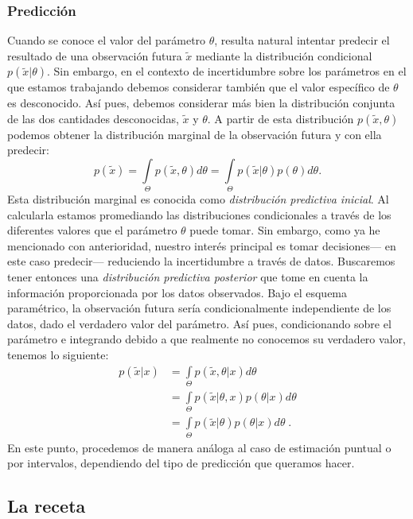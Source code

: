 \subsubsection*{Predicción}

Cuando se conoce el valor del parámetro $\theta$, resulta natural intentar predecir el resultado de una observación futura $\tilde{x}$ mediante la distribución condicional $p(\tilde{x}|\theta)$. Sin embargo, en el contexto de incertidumbre sobre los parámetros en el que estamos trabajando debemos considerar también que el valor específico de $\theta$ es desconocido. Así pues, debemos considerar más bien la distribución conjunta de las dos cantidades desconocidas, $\tilde{x}$ y $\theta$. A partir de esta distribución $p(\tilde{x},\theta)$ podemos obtener la distribución marginal de la observación futura y con ella predecir: 
\begin{equation*} 
p(\tilde{x})=\int\limits_\Theta p(\tilde{x},\theta)d\theta=\int\limits_\Theta p(\tilde{x}|\theta)p(\theta)d\theta.
\end{equation*}
Esta distribución marginal es conocida como \textit{distribución predictiva inicial}. Al calcularla estamos promediando las distribuciones condicionales a través de los diferentes valores que el parámetro $\theta$ puede tomar. Sin embargo, como ya he mencionado con anterioridad, nuestro interés principal es tomar decisiones--- en este caso predecir--- reduciendo la incertidumbre a través de datos. Buscaremos tener entonces una \textit{distribución predictiva posterior} que tome en cuenta la información proporcionada por los datos observados. Bajo el esquema paramétrico, la observación futura sería condicionalmente independiente de los datos, dado el verdadero valor del parámetro. Así pues, condicionando sobre el parámetro e integrando debido a que realmente no conocemos su verdadero valor, tenemos lo siguiente:
\begin{align*}
p(\tilde{x}|x)&=\int\limits_\Theta p(\tilde{x},\theta|x)d\theta \\
&=\int\limits_\Theta p(\tilde{x}|\theta,x)p(\theta|x)d\theta\\
&=\int\limits_\Theta p(\tilde{x}|\theta)p(\theta|x)d\theta\;.
\end{align*}
En este punto, procedemos de manera análoga al caso de estimación puntual o por intervalos, dependiendo del tipo de predicción que queramos hacer.

\subsection{La receta}

